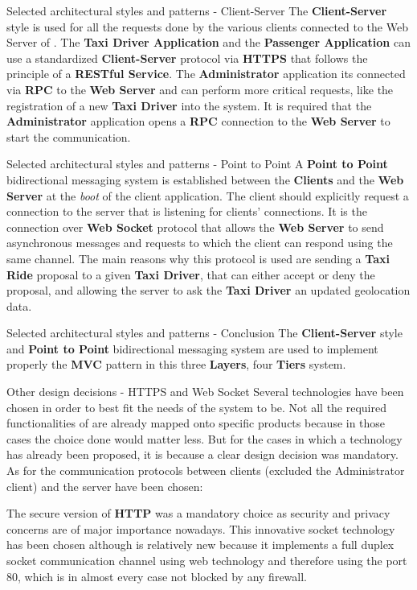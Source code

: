 \documentclass{../common/latex_classes/pdf_presentation}
\begin{document}
	\begin{frame}{Selected architectural styles and patterns - Client-Server}
		The \textbf{Client-Server} style is used for all the requests done by the various clients connected to the Web Server of \myTaxiService{}.
		The \textbf{Taxi Driver Application} and the \textbf{Passenger Application} can use a standardized \textbf{Client-Server} protocol via \textbf{HTTPS} that follows the principle of a \textbf{RESTful Service}.
		The \textbf{Administrator} application its connected via \textbf{RPC} to the \textbf{Web Server} and can perform more critical requests, like the registration of a new \textbf{Taxi Driver} into the system.
		It is required that the \textbf{Administrator} application opens a \textbf{RPC} connection to the \textbf{Web Server} to start the communication.
	\end{frame}
	\begin{frame}{Selected architectural styles and patterns - Point to Point}
		A \textbf{Point to Point} bidirectional messaging system is established between the \textbf{Clients} and the \textbf{Web Server} at the \textit{boot} of the client application.
		The client should explicitly request a connection to the server that is listening for clients' connections.
		It is the connection over \textbf{Web Socket} protocol that allows the \textbf{Web Server} to send asynchronous messages and requests to which the client can respond using the same channel.
		The main reasons why this protocol is used are sending a \textbf{Taxi Ride} proposal to a given \textbf{Taxi Driver}, that can either accept or deny the proposal, and allowing the server to ask the \textbf{Taxi Driver} an updated geolocation data.
	\end{frame}
	\begin{frame}{Selected architectural styles and patterns - Conclusion}
		The \textbf{Client-Server} style and \textbf{Point to Point} bidirectional messaging system are used to implement properly the \textbf{MVC} pattern in this three \textbf{Layers}, four \textbf{Tiers} system.
	\end{frame}
	\begin{frame}{Other design decisions - HTTPS and Web Socket}
		Several technologies have been chosen in order to best fit the needs of the system to be.
		Not all the required functionalities of \myTaxiService{} are already mapped onto specific products because in those cases the choice done would matter less.
		But for the cases in which a technology has already been proposed, it is because a clear design decision was mandatory.
		As for the communication protocols between clients (excluded the Administrator client) and the server have been chosen:
		\begin{itemize}
			 The secure version of \textbf{HTTP} was a mandatory choice as security and privacy concerns are of major importance nowadays.
			 This innovative socket technology has been chosen although is relatively new because it implements a full duplex socket communication channel using web technology and therefore using the port 80, which is in almost every case not blocked by any firewall.
		\end{itemize}
	\end{frame}
\end{document}
